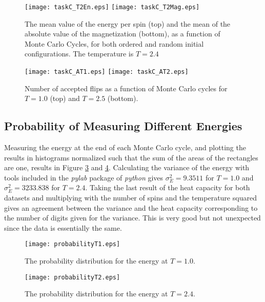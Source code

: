 \documentclass[11pt, a4paper]{article}
\begin{document}
\begin{figure}[!ht]
\texttt{[image: taskC\_T2En.eps]}
\texttt{[image: taskC\_T2Mag.eps]}
\caption{The mean value of the energy per spin (top) and the mean of the absolute value of the magnetization (bottom), as a function of Monte Carlo Cycles, for both ordered and random initial configurations. The temperature is $T=2.4$}
\label{fig:magEnT2}
\end{figure}

\begin{figure}[!ht]
\texttt{[image: taskC\_AT1.eps]}
\texttt{[image: taskC\_AT2.eps]}
\caption{Number of accepted flips as a function of Monte Carlo cycles for $T=1.0$ (top) and $T=2.5$ (bottom).}
\label{fig:aflips}
\end{figure}



\clearpage

\subsection{Probability of Measuring Different Energies}
Measuring the energy at the end of each Monte Carlo cycle, and plotting the results in histograms normalized such that the sum of the areas of the rectangles are one, results in Figure \ref{fig:histT1} and \ref{fig:histT2}. Calculating the variance of the energy with tools included in the \textit{pylab} package of \textit{python} gives $\sigma_E^2= 9.3511$ for $T = 1.0$ and $\sigma_E^2 = 3233.838$ for $T = 2.4$. Taking the last result of the heat capacity for both datasets and multiplying with the number of spins and the temperature squared gives an agreement between the variance and the heat capacity corresponding to the number of digits given for the variance. This is very good but not unexpected since the data is essentially the same.
\begin{figure}[!ht]
\texttt{[image: probabilityT1.eps]}
\caption{The probability distribution for the energy at $T=1.0$.}
\label{fig:histT1}
\end{figure}

\begin{figure}[!ht]
\texttt{[image: probabilityT2.eps]}
\caption{The probability distribution for the energy at $T=2.4$.}
\label{fig:histT2}
\end{figure}
\end{document}

